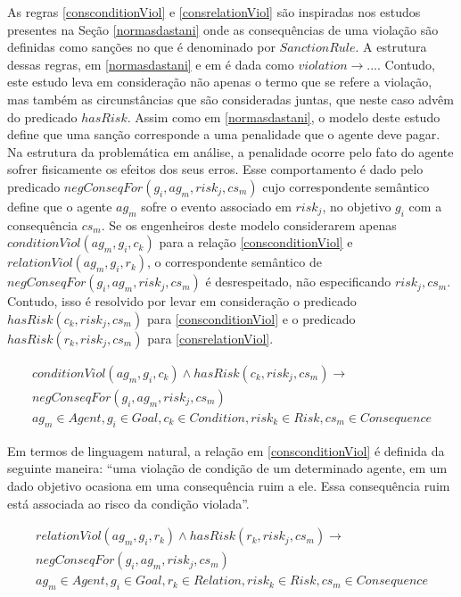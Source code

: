 As regras \ref{consconditionViol} e \ref{consrelationViol} são inspiradas nos estudos presentes na Seção \ref{normasdastani} onde as consequências de uma violação são definidas como sanções no que é denominado por $Sanction Rule$. A estrutura dessas regras, em \ref{normasdastani} e em \cite{dastaniframework} é dada como $violation \to ... $. Contudo, este estudo leva em consideração não apenas o termo que se refere a violação, mas também as circunstâncias que são consideradas juntas, que neste caso advêm do predicado $hasRisk$. Assim como em \ref{normasdastani}, o modelo deste estudo define que uma sanção corresponde a uma penalidade que o agente deve pagar. Na estrutura da problemática em análise, a penalidade ocorre pelo fato do agente sofrer fisicamente os efeitos dos seus erros. Esse comportamento é dado pelo predicado $negConseqFor(g_i,ag_m,risk_j,cs_m)$ cujo correspondente semântico define que o agente $ag_m$ sofre o evento associado em $risk_j$, no objetivo $g_i$ com a consequência $cs_m$. Se os engenheiros deste modelo considerarem apenas $conditionViol(ag_m,g_i,c_k)$ para a relação \ref{consconditionViol} e $relationViol(ag_m,g_i,r_k)$, o correspondente semântico de $negConseqFor(g_i,ag_m,risk_j,cs_m)$ é desrespeitado, não especificando $risk_j,cs_m$. Contudo, isso é resolvido por levar em consideração o predicado $hasRisk(c_k,risk_j,cs_m)$ para \ref{consconditionViol} e o predicado $hasRisk(r_k,risk_j,cs_m)$ para \ref{consrelationViol}. 

\begin{eqnarray}\label{consconditionViol}\nonumber
	conditionViol(ag_m,g_i,c_k)  \wedge hasRisk(c_k,risk_j,cs_m) \to \nonumber \\ 
	negConseqFor(g_i,ag_m,risk_j,cs_m) \nonumber \\ 
    ag_m \in Agent, g_i \in Goal, c_k \in Condition, risk_k \in Risk, cs_m \in Consequence
\end{eqnarray}

Em termos de linguagem natural, a relação em \ref{consconditionViol} é definida da seguinte maneira: ``uma violação de condição de um determinado agente, em um dado objetivo ocasiona em uma consequência ruim a ele. Essa consequência ruim está associada ao risco da condição violada''. 

\begin{eqnarray}\label{consrelationViol}\nonumber
	relationViol(ag_m,g_i,r_k) \wedge hasRisk(r_k,risk_j,cs_m) \to \\ 
	negConseqFor(g_i,ag_m,risk_j,cs_m) \nonumber \\ 
    ag_m \in Agent, g_i \in Goal, r_k \in Relation, risk_k \in Risk, cs_m \in Consequence 
\end{eqnarray}

